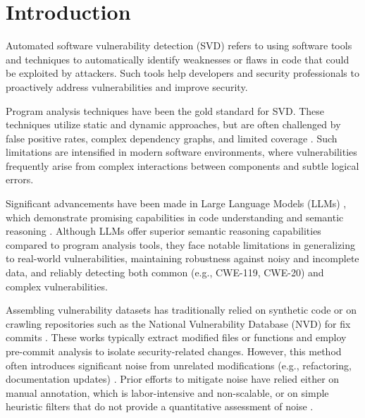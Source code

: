 \documentclass[sigconf]{acmart}
\begin{document}
\section{Introduction}

Automated software vulnerability detection (SVD) refers to using software tools and techniques to automatically identify weaknesses or flaws in code that could be exploited by attackers. 
Such tools help developers and security professionals to proactively address vulnerabilities and improve security.

Program analysis techniques have been the gold standard for SVD. These techniques utilize static and dynamic approaches, but are often challenged by false positive rates, complex dependency graphs, and limited coverage \cite{manes2019art, klees2018evaluating, pereira2021machine, li2024llm}. Such limitations are intensified in modern software environments, where vulnerabilities frequently arise from complex interactions between components and subtle logical errors.

Significant advancements have been made in Large Language Models (LLMs) \cite{chen2021evaluating, dubey2024llama, guo2025deepseek}, which demonstrate promising capabilities in code understanding and semantic reasoning \cite{guo2024deepseek, roziere2023code}. Although LLMs offer superior semantic reasoning capabilities compared to program analysis tools, they face notable limitations in generalizing to real-world vulnerabilities, maintaining robustness against noisy and incomplete data, and reliably detecting both common (e.g., CWE-119, CWE-20) and complex vulnerabilities. 

Assembling vulnerability datasets has traditionally relied on synthetic code or on crawling repositories such as the National Vulnerability Database (NVD) for fix commits \cite{bhandari2021cvefixes, chakraborty2021deep, pereira2022software, chen2023diversevul}. These works typically extract modified files or functions and employ pre-commit analysis to isolate security-related changes. However, this method often introduces significant noise from unrelated modifications (e.g., refactoring, documentation updates) \cite{iannone2022secret, croft2022noisy}. Prior efforts to mitigate noise have relied either on manual annotation, which is labor-intensive and non-scalable, or on simple heuristic filters that do not provide a quantitative assessment of noise \cite{zhou2019devign, hommersom2024automated, gao2023far, siddiq2022securityeval, fan2020ac, thomas2022dynamic}.
\end{document}
